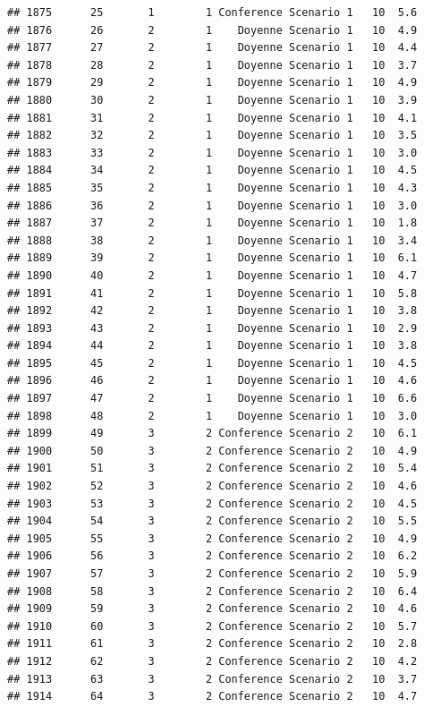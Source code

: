 \documentclass[
]{article}
\begin{document}
\begin{verbatim}
## 1875      25       1        1 Conference Scenario 1   10  5.6
## 1876      26       2        1    Doyenne Scenario 1   10  4.9
## 1877      27       2        1    Doyenne Scenario 1   10  4.4
## 1878      28       2        1    Doyenne Scenario 1   10  3.7
## 1879      29       2        1    Doyenne Scenario 1   10  4.9
## 1880      30       2        1    Doyenne Scenario 1   10  3.9
## 1881      31       2        1    Doyenne Scenario 1   10  4.1
## 1882      32       2        1    Doyenne Scenario 1   10  3.5
## 1883      33       2        1    Doyenne Scenario 1   10  3.0
## 1884      34       2        1    Doyenne Scenario 1   10  4.5
## 1885      35       2        1    Doyenne Scenario 1   10  4.3
## 1886      36       2        1    Doyenne Scenario 1   10  3.0
## 1887      37       2        1    Doyenne Scenario 1   10  1.8
## 1888      38       2        1    Doyenne Scenario 1   10  3.4
## 1889      39       2        1    Doyenne Scenario 1   10  6.1
## 1890      40       2        1    Doyenne Scenario 1   10  4.7
## 1891      41       2        1    Doyenne Scenario 1   10  5.8
## 1892      42       2        1    Doyenne Scenario 1   10  3.8
## 1893      43       2        1    Doyenne Scenario 1   10  2.9
## 1894      44       2        1    Doyenne Scenario 1   10  3.8
## 1895      45       2        1    Doyenne Scenario 1   10  4.5
## 1896      46       2        1    Doyenne Scenario 1   10  4.6
## 1897      47       2        1    Doyenne Scenario 1   10  6.6
## 1898      48       2        1    Doyenne Scenario 1   10  3.0
## 1899      49       3        2 Conference Scenario 2   10  6.1
## 1900      50       3        2 Conference Scenario 2   10  4.9
## 1901      51       3        2 Conference Scenario 2   10  5.4
## 1902      52       3        2 Conference Scenario 2   10  4.6
## 1903      53       3        2 Conference Scenario 2   10  4.5
## 1904      54       3        2 Conference Scenario 2   10  5.5
## 1905      55       3        2 Conference Scenario 2   10  4.9
## 1906      56       3        2 Conference Scenario 2   10  6.2
## 1907      57       3        2 Conference Scenario 2   10  5.9
## 1908      58       3        2 Conference Scenario 2   10  6.4
## 1909      59       3        2 Conference Scenario 2   10  4.6
## 1910      60       3        2 Conference Scenario 2   10  5.7
## 1911      61       3        2 Conference Scenario 2   10  2.8
## 1912      62       3        2 Conference Scenario 2   10  4.2
## 1913      63       3        2 Conference Scenario 2   10  3.7
## 1914      64       3        2 Conference Scenario 2   10  4.7

\end{verbatim}
\end{document}
